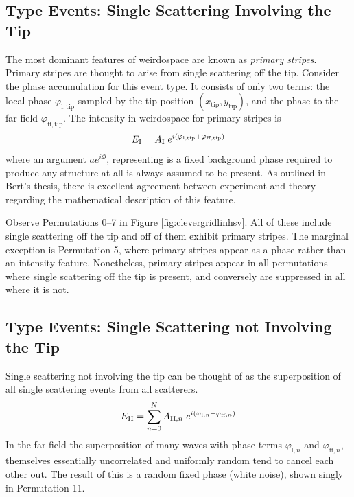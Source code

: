 \subsection{Type  Events: Single Scattering Involving the Tip}
The most dominant features of weirdospace are known as {\it primary
    stripes}.  Primary stripes are thought to arise from single scattering off
the tip.  Consider the phase accumulation for this event type.  It consists
of only two terms: the local phase $\varphi_\mathrm{l,tip}$ sampled by the tip
position $(x_\mathrm{tip},y_\mathrm{tip})$, and the phase to the far field
$\varphi_\mathrm{ff,tip}$.  The intensity in weirdospace for primary stripes is
\begin{align}
  E_\mathrm{\Rmnum{1}}=
  A_\mathrm{\Rmnum{1}}\;
  e^{i(\varphi_\mathrm{l,tip}+\varphi_\mathrm{ff,tip})}
\end{align}
where an argument $a e^{i \Phi}$, representing is a fixed background phase required to
produce any structure at all is always assumed to be present.  As outlined in Bert's thesis, there is
excellent agreement between experiment and theory regarding the
mathematical description of this feature.

Observe Permutations \numrange{0}{7} in Figure \ref{fig:clevergridlinhsv}.  All of these include single
scattering off the tip and off of them exhibit primary stripes.  The
marginal exception is Permutation \num{5}, where primary stripes appear as
a phase rather than an intensity feature.  Nonetheless, primary stripes
appear in all permutations where single scattering off the tip is present, and
conversely are suppressed in all where it is not.

\subsection{Type  Events: Single Scattering not Involving the Tip}
Single scattering not involving the tip can be thought of as the
superposition of all single scattering events from all scatterers.
\begin{align}
  E_\mathrm{\Rmnum{2}}=
  \sum_{n=0}^{N}
  A_{\mathrm{\Rmnum{2}},n}\;
  e^{i(\varphi_{\mathrm{l},n}+\varphi_{\mathrm{ff},n})}
\end{align}
In the far field the superposition of many waves with phase terms
$\varphi_{\mathrm{l},n}$ and $\varphi_{\mathrm{ff},n}$, themselves
essentially uncorrelated and uniformly random tend to cancel each other out.
The result of this is a random fixed phase (white noise), shown singly in
Permutation \num{11}.

